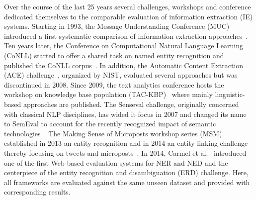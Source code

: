 Over the course of the last 25 years several challenges, workshops and conference dedicated themselves to the comparable evaluation of information extraction (IE) systems. 
Starting in 1993, the Message Understanding Conference (MUC) introduced a first systematic comparison of information extraction approaches~\cite{Sundheim:1993:TIE:1072017.1072023}.
Ten years later, the Conference on Computational Natural Language Learning (CoNLL) started to offer a shared task on named entity recognition and published the CoNLL corpus~\cite{conll2003}.
In addition, the Automatic Content Extraction (ACE) challenge~\cite{doddington2004automatic}, organized by NIST, evaluated several approaches but was discontinued in 2008. 
Since 2009, the text analytics conference hosts the workshop on knowledge base population (TAC-KBP)~\cite{mcnamee2009overview} where mainly linguistic-based approaches are published.
The Senseval challenge, originally concerned with classical NLP disciplines, has wided it focus in 2007 and changed its name to SemEval to account for the recently recognized impact of semantic technologies~\cite{kilgarri1998senseval}.
The Making Sense of Microposts workshop series (MSM) established in 2013 an entity recognition and in 2014 an entity linking challenge thereby focusing on tweets and microposts~\cite{MSM2014}.
In 2014, Carmel et al.~\cite{ERD2014} introduced one of the first Web-based evaluation systems for NER and NED and the centerpiece of the entity recognition and disambiguation (ERD) challenge. Here, all frameworks are evaluated against the same unseen dataset and provided with corresponding results. 


